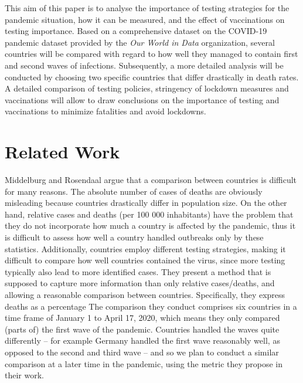 \documentclass[a4paper,11pt]{article}
\begin{document}
This aim of this paper is to analyse the importance of testing strategies for the pandemic situation, how it can be measured, and the effect of vaccinations on testing importance.  Based on a comprehensive dataset on the COVID-19 pandemic dataset provided by the \textit{Our World in Data} organization, several countries will be compared with regard to how well they managed to contain first and second waves of infections. Subsequently, a more detailed analysis will be conducted by choosing two specific countries that differ drastically in death rates. A detailed comparison of testing policies, stringency of lockdown measures and vaccinations will allow to draw conclusions on the importance of testing and vaccinations to minimize fatalities and avoid lockdowns.

\section{Related Work}

Middelburg and Rosendaal \cite{middelburg2020covid} argue that a comparison between countries is difficult for many reasons. The absolute number of
cases of deaths are obviously misleading because countries drastically differ in population size. On the other hand, 
relative cases and deaths (per 100 000 inhabitants) have the problem that they do not incorporate how much a country is 
affected by the pandemic, thus it is difficult to assess how well a country handled outbreaks only by these statistics.
Additionally, countries employ different testing strategies, making it difficult to compare how well countries contained the virus,
since more testing typically also lead to more identified cases.
They present a method that is supposed to capture more information than only relative cases/deaths, and allowing a reasonable comparison between countries. Specifically, they express deaths as a percentage 
The comparison they conduct comprises six countries in a time frame
of January 1 to April 17, 2020, which means they only compared (parts of) the first wave of the pandemic. Countries handled
the waves quite differently -- for example Germany handled the first wave reasonably well, as opposed to the second and third wave --
and so we plan to conduct a similar comparison at a later time in the pandemic, using the metric they propose in their work.
\end{document}
